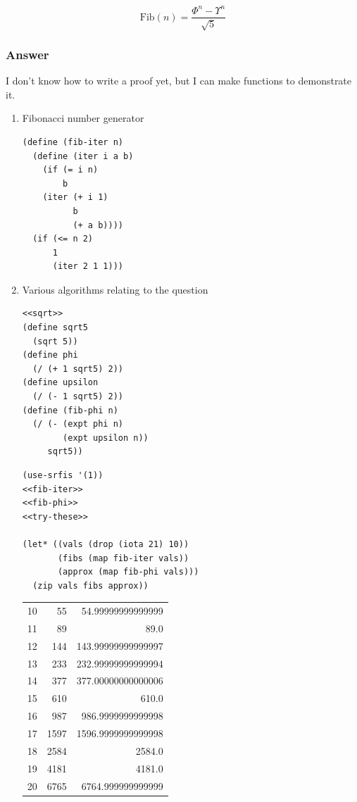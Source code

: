 \documentclass[final,fleqn,titlepage,twoside]{article}
\begin{document}
\[
 \text{Fib}(n) = \frac{\Phi^n - \Upsilon^n}{\sqrt{5}}
\]

\subsubsection{Answer}
\label{sec:orgf3e7a16}
I don't know how to write a proof yet, but I can make functions to
demonstrate it.

\begin{enumerate}
\item Fibonacci number generator
\label{sec:org3163f82}
\begin{verbatim}
(define (fib-iter n)
  (define (iter i a b)
    (if (= i n)
        b
    (iter (+ i 1)
          b
          (+ a b))))
  (if (<= n 2)
      1
      (iter 2 1 1)))
\end{verbatim}

\item Various algorithms relating to the question
\label{sec:orgab9f359}
\begin{verbatim}
<<sqrt>>
(define sqrt5
  (sqrt 5))
(define phi
  (/ (+ 1 sqrt5) 2))
(define upsilon
  (/ (- 1 sqrt5) 2))
(define (fib-phi n)
  (/ (- (expt phi n)
        (expt upsilon n))
     sqrt5))
\end{verbatim}
\begin{verbatim}
(use-srfis '(1))
<<fib-iter>>
<<fib-phi>>
<<try-these>>

(let* ((vals (drop (iota 21) 10))
       (fibs (map fib-iter vals))
       (approx (map fib-phi vals)))
  (zip vals fibs approx))
\end{verbatim}

\begin{center}
\begin{tabular}{rrr}
10 & 55 & 54.99999999999999\\[0pt]
11 & 89 & 89.0\\[0pt]
12 & 144 & 143.99999999999997\\[0pt]
13 & 233 & 232.99999999999994\\[0pt]
14 & 377 & 377.00000000000006\\[0pt]
15 & 610 & 610.0\\[0pt]
16 & 987 & 986.9999999999998\\[0pt]
17 & 1597 & 1596.9999999999998\\[0pt]
18 & 2584 & 2584.0\\[0pt]
19 & 4181 & 4181.0\\[0pt]
20 & 6765 & 6764.999999999999\\[0pt]
\end{tabular}
\end{center}


\end{enumerate}
\end{document}
